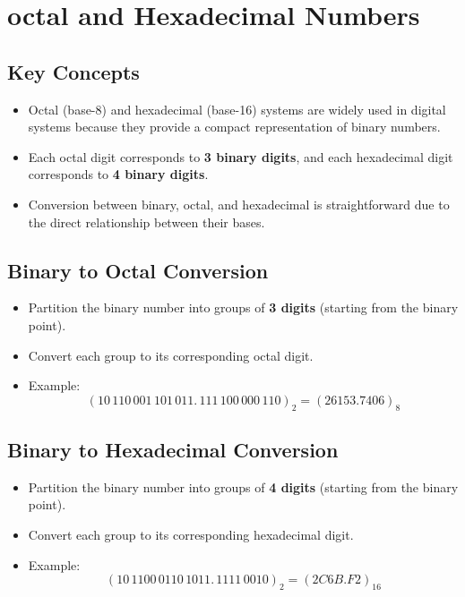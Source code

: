 \documentclass[a4paper,12pt]{article}
\begin{document}
\newpage

\section{octal and Hexadecimal Numbers}
\subsection*{Key Concepts}
	\begin{itemize}
		\item Octal (base-8) and hexadecimal (base-16) systems are widely used in digital systems because they provide a compact representation of binary numbers.
		\item Each octal digit corresponds to \textbf{3 binary digits}, and each hexadecimal digit corresponds to \textbf{4 binary digits}.
		\item Conversion between binary, octal, and hexadecimal is straightforward due to the direct relationship between their bases.
	\end{itemize}
	
	\subsection*{Binary to Octal Conversion}
	\begin{itemize}
		\item Partition the binary number into groups of \textbf{3 digits} (starting from the binary point).
		\item Convert each group to its corresponding octal digit.
		\item Example:
		\[
		(10\,110\,001\,101\,011.\,111\,100\,000\,110)_2 = (26153.7406)_8
		\]
	\end{itemize}
	
	\subsection*{Binary to Hexadecimal Conversion}
	\begin{itemize}
		\item Partition the binary number into groups of \textbf{4 digits} (starting from the binary point).
		\item Convert each group to its corresponding hexadecimal digit.
		\item Example:
		\[
		(10\,1100\,0110\,1011.\,1111\,0010)_2 = (2C6B.F2)_{16}
		\]
	\end{itemize}
	
\end{document}
